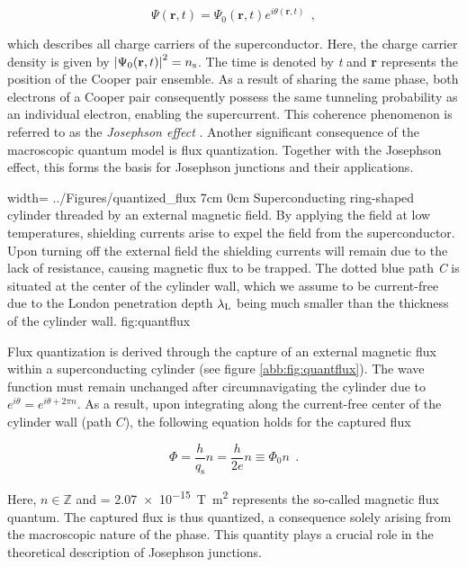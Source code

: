 \begin{equation}
\Psi(\textbf{r},t) = \Psi_0(\textbf{r},t)e^{i\theta(\textbf{r},t)} \ \ ,
\end{equation}

which describes all charge carriers of the superconductor. Here, the charge carrier density is given by $\left|\Psi_0(\textbf{r},t)\right|^2 = n_{\rm s}$. The time is denoted by \textit{t} and \textbf{r} represents the position of the Cooper pair ensemble. As a result of sharing the same phase, both electrons of a Cooper pair consequently possess the same tunneling probability as an individual electron, enabling the supercurrent. This coherence phenomenon is referred to as the \textit{Josephson effect} \cite{Josephson1962}. Another significant consequence of the macroscopic quantum model is flux quantization. Together with the Josephson effect, this forms the basis for Josephson junctions and their applications.

{width=\textwidth}
{../Figures/quantized_flux}
{7cm}
{0cm}
{Superconducting ring-shaped cylinder threaded by an external magnetic field. By applying the field at low temperatures, shielding currents arise to expel the field from the superconductor. Upon turning off the external field the shielding currents will remain due to the lack of resistance, causing magnetic flux to be trapped. The dotted blue path \textit{C} is situated at the center of the cylinder wall, which we assume to be current-free due to the London penetration depth $\lambda_{\rm L}$ being much smaller than the thickness of the cylinder wall.} 
{fig:quantflux}

Flux quantization is derived through the capture of an external magnetic flux within a superconducting cylinder (see figure \ref{abb:fig:quantflux}). The wave function must remain unchanged after circumnavigating the cylinder due to $e^{i\theta} = e^{i\theta + 2\pi n}$. As a result, upon integrating along the current-free center of the cylinder wall (path $C$), the following equation holds for the captured flux

\begin{equation}
\Phi = \frac{h}{q_\mathrm{s}}n = \frac{h}{2e}n \equiv \Phi_0n \ \ .
\end{equation}

Here, $n\in\mathbb{Z}$ and \unit{\fq} = \qty{2.07e-15}{\tesla\metre\squared} \cite{CODATA2018} represents the so-called magnetic flux quantum. The captured flux is thus quantized, a consequence solely arising from the macroscopic nature of the phase. This quantity plays a crucial role in the theoretical description of Josephson junctions.


